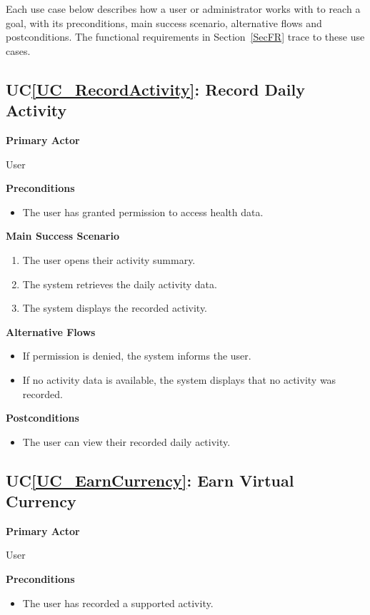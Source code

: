 \documentclass[12pt]{article}
\newcounter{ucnum} %
\newcommand{\ucref}[1]{UC\ref{#1}}
\begin{document}
Each use case below describes how a user or administrator works with
\progname{} to reach a goal, with its preconditions, main success scenario,
alternative flows and postconditions. The functional requirements in
Section~\ref{SecFR} trace to these use cases.


\label{UC_RecordActivity}
\subsection{\ucref{UC_RecordActivity}: Record Daily Activity}

\textbf{Primary Actor}

User

\textbf{Preconditions}
\begin{itemize}
\item The user has granted permission to access health data.
\end{itemize}

\textbf{Main Success Scenario}
\begin{enumerate}
\item The user opens their activity summary.
\item The system retrieves the daily activity data.
\item The system displays the recorded activity.
\end{enumerate}

\textbf{Alternative Flows}
\begin{itemize}
\item If permission is denied, the system informs the user.
\item If no activity data is available, the system displays that no activity was recorded.
\end{itemize}

\textbf{Postconditions}
\begin{itemize}
\item The user can view their recorded daily activity.
\end{itemize}


\label{UC_EarnCurrency}
\subsection{\ucref{UC_EarnCurrency}: Earn Virtual Currency}

\textbf{Primary Actor}

User

\textbf{Preconditions}
\begin{itemize}
\item The user has recorded a supported activity.
\end{itemize}
\end{document}
